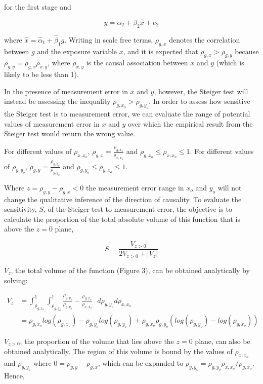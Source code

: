 \documentclass[]{article}
\begin{document}
for the first stage and

\[
y = \alpha_2 + \beta_2 \hat{x} + e_2
\]

where \(\hat{x} = \hat{\alpha}_1 + \hat{\beta}_1 g\). Writing in scale
free terms, \(\rho_{g, x}\) denotes the correlation between \(g\) and
the exposure variable \(x\), and it is expected that
\(\rho_{g, x} > \rho_{g, y}\) because
\(\rho_{g, y} = \rho_{g, x}\rho_{x, y}\), where \(\rho_{x, y}\) is the
causal association between \(x\) and \(y\) (which is likely to be less
than 1).

In the presence of measurement error in \(x\) and \(y\), however, the
Steiger test will instead be assessing the inequality
\(\rho_{g, x_o} > \rho_{g, y_o}\). In order to assess how sensitive the
Steiger test is to measurement error, we can evaluate the range of
potential values of measurement error in \(x\) and \(y\) over which the
empirical result from the Steiger test would return the wrong value.

For different values of \(\rho_{x,x_o}\),
\(\rho_{g,x} = \frac{\rho_{g, x_o}}{\rho_{x,x_o}}\) and
\(\rho_{g,x_o} \leq \rho_{x,x_o} \leq 1\). For different values of
\(\rho_{y,y_o}\), \(\rho_{g,y} = \frac{\rho_{g, y_o}}{\rho_{y,y_o}}\)
and \(\rho_{g,y_o} \leq \rho_{y,x_o} \leq 1\).

Where \(z = \rho_{g,y} - \rho_{g,x} < 0\) the measurement error range in
\(x_o\) and \(y_o\) will not change the qualitative inference of the
direction of causality. To evaluate the sensitivity, \(S\), of the
Steiger test to measurement error, the objective is to calculate the
proportion of the total absolute volume of this function that is above
the \(z = 0\) plane,

\[
S = \frac{V_{z>0}}{2V_{z>0} + |V_{z}|}
\]

\(V_{z}\), the total volume of the function (Figure 3), can be obtained
analytically by solving:

\[
\begin{aligned}
V_z & = \int^1_{\rho_{g,x_o}} \int^1_{\rho_{g,y_o}} \frac{\rho_{g,y_o}}{\rho_{y,y_o}} - \frac{\rho_{g,x_o}}{\rho_{x,x_o}}\,\,\,\, d\rho_{y,y_o}d\rho_{x,x_o} \\
& = \rho_{g,x_o}log(\rho_{g,x_o}) - \rho_{g,y_o}log(\rho_{g,y_o}) + \rho_{g,x_o}\rho_{g,y_o}(log(\rho_{g,y_o})-log(\rho_{g,x_o}))
\end{aligned}
\]

\(V_{z>0}\), the proportion of the volume that lies above the \(z=0\)
plane, can also be obtained analytically. The region of this volume is
bound by the values of \(\rho_{x,x_o}\) and \(\rho_{y,y_o}\) where
\(0 = \rho_{g,y} - \rho_{g,x}\), which can be expanded to
\(\rho_{y,y_o} = \rho_{g,y_o}\rho_{x,x_o} / \rho_{g,x_o}\). Hence,
\end{document}

